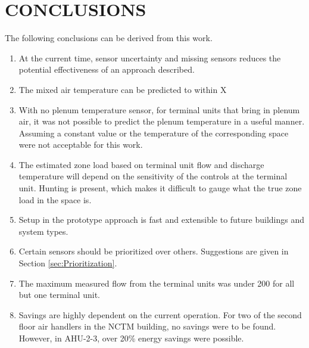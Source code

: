 \chapter{\uppercase{Conclusions}} 

The following conclusions can be derived from this work.

\begin{enumerate}
    \item At the current time, sensor uncertainty and missing sensors
        reduces the potential effectiveness of an approach described.
    \item The mixed air temperature can be predicted to within X
    \item With no plenum temperature sensor, for terminal units that
        bring in plenum air, it was not possible to predict the plenum
        temperature in a useful manner. Assuming a constant value or the
        temperature of the corresponding space were not acceptable for
        this work. 
    \item The estimated zone load based on terminal unit flow and
        discharge temperature will depend on the sensitivity of the
        controls at the terminal unit. Hunting is present, which makes
        it difficult to gauge what the true zone load in the space is. 
    \item Setup in the prototype approach is fast and extensible to
        future buildings and system types. 
    \item Certain sensors should be prioritized over others. Suggestions
        are given in Section \ref{sec:Prioritization}. 
    \item The maximum measured flow from the terminal units was under
        \SI{200}{\CFM} for all but one terminal unit. 
    \item Savings are highly dependent on the current operation. For two
        of the second floor air handlers in the NCTM building, no
        savings were to be found. However, in AHU-2-3, over 20\% energy
        savings were possible. 
\end{enumerate}
